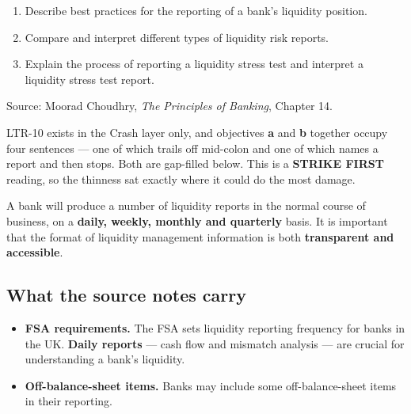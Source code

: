 
\begin{lrkeybox}
\begin{enumerate}[label=\textbf{\alph*.}]
\item Describe best practices for the reporting of a bank's liquidity position.
\item Compare and interpret different types of liquidity risk reports.
\item Explain the process of reporting a liquidity stress test and interpret a liquidity stress test report.
\end{enumerate}
{\footnotesize\color{FRMGrey}Source: Moorad Choudhry, \textit{The Principles of Banking}, Chapter 14.}
\end{lrkeybox}

\begin{lrtrapbox}
LTR-10 exists in the Crash layer only, and objectives \textbf{a} and \textbf{b} together occupy four sentences --- one of which trails off mid-colon and one of which names a report and then stops. Both are gap-filled below. This is a \textbf{STRIKE FIRST} reading, so the thinness sat exactly where it could do the most damage.
\end{lrtrapbox}


A bank will produce a number of liquidity reports in the normal course of business, on a \textbf{daily, weekly, monthly and quarterly} basis. It is important that the format of liquidity management information is both \textbf{transparent and accessible}.

\subsection{What the source notes carry}

\begin{itemize}
\item \textbf{FSA requirements.} The FSA sets liquidity reporting frequency for banks in the UK. \textbf{Daily reports} --- cash flow and mismatch analysis --- are crucial for understanding a bank's liquidity.
\item \textbf{Off-balance-sheet items.} Banks may include some off-balance-sheet items in their reporting.
\end{itemize}


